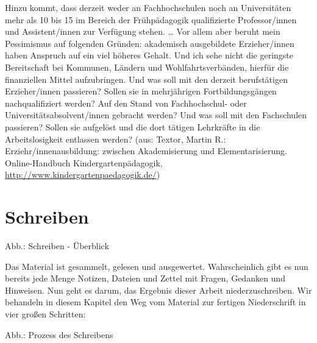 \documentclass[]{book}
\theoremstyle{definition}
\theoremstyle{definition}
\theoremstyle{definition}
\theoremstyle{remark}
\begin{document}
\begin{enumerate}
  Hinzu kommt, dass derzeit weder an Fachhochschulen noch an
  Universitäten mehr als 10 bis 15 im Bereich der Frühpädagogik
  qualifizierte Professor/innen und Assistent/innen zur Verfügung
  stehen. \ldots{} Vor allem aber beruht mein Pessimismus auf folgenden
  Gründen: akademisch ausgebildete Erzieher/innen haben Anspruch auf ein
  viel höheres Gehalt. Und ich sehe nicht die geringste Bereitschaft bei
  Kommunen, Ländern und Wohlfahrtsverbänden, hierfür die finanziellen
  Mittel aufzubringen. Und was soll mit den derzeit berufstätigen
  Erzieher/innen passieren? Sollen sie in mehrjährigen
  Fortbildungsgängen nachqualifiziert werden? Auf den Stand von
  Fachhochschul- oder Universitätsabsolvent/innen gebracht werden? Und
  was soll mit den Fachschulen passieren? Sollen sie aufgelöst und die
  dort tätigen Lehrkräfte in die Arbeitslosigkeit entlassen werden?
  (aus: Textor, Martin R.: Erziehr/innenausbildung: zwischen
  Akademisierung und Elementarisierung. Online-Handbuch
  Kindergartenpädagogik, \url{http://www.kindergartenpaedagogik.de/})
\end{enumerate}

\chapter{Schreiben}\label{schreiben}

Abb.: Schreiben - Überblick

Das Material ist gesammelt, gelesen und ausgewertet. Wahrscheinlich gibt
es nun bereits jede Menge Notizen, Dateien und Zettel mit Fragen,
Gedanken und Hinweisen. Nun geht es darum, das Ergebnis dieser Arbeit
niederzuschreiben. Wir behandeln in diesem Kapitel den Weg vom Material
zur fertigen Niederschrift in vier großen Schritten:

Abb.: Prozess des Schreibens
\end{document}
